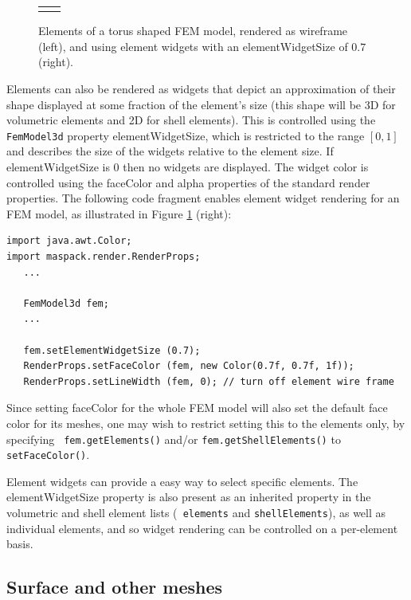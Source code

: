 \begin{figure}[h]
\begin{center}
\begin{tabular}{cc}
\fi
\end{tabular}
\end{center}
\caption{Elements of a torus shaped FEM model, rendered
as wireframe (left), and using element widgets with an {\sf
elementWidgetSize} of $0.7$ (right).}
\label{femElemRender:fig} 
\end{figure}

Elements can also be rendered as widgets that depict an approximation
of their shape displayed at some fraction of the element's size (this
shape will be 3D for volumetric elements and 2D for shell
elements). This is controlled using the {\tt FemModel3d} property {\sf
elementWidgetSize}, which is restricted to the range $[0, 1]$ and
describes the size of the widgets relative to the element size. If
{\sf elementWidgetSize} is 0 then no widgets are displayed.  The
widget color is controlled using the {\sf faceColor} and {\sf alpha}
properties of the standard render properties.  The following code
fragment enables element widget rendering for an FEM model, as
illustrated in Figure \ref{femElemRender:fig} (right):
%
\begin{lstlisting}[]
import java.awt.Color;
import maspack.render.RenderProps;
   ...

   FemModel3d fem;
   ...

   fem.setElementWidgetSize (0.7);
   RenderProps.setFaceColor (fem, new Color(0.7f, 0.7f, 1f));
   RenderProps.setLineWidth (fem, 0); // turn off element wire frame
\end{lstlisting}
%
Since setting {\sf faceColor} for the whole FEM model will also set
the default face color for its meshes, one may wish to restrict
setting this to the elements only, by specifying {\tt
fem.getElements()} and/or {\tt fem.getShellElements()} to {\tt
setFaceColor()}.

Element widgets can provide a easy way to select specific
elements. The {\sf elementWidgetSize} property is also present as an
inherited property in the volumetric and shell element lists ({\tt
elements} and {\tt shellElements}), as well as individual elements,
and so widget rendering can be controlled on a per-element basis.

\subsection{Surface and other meshes}
\label{FemMeshRendering:sec}

